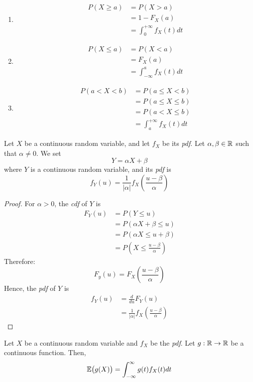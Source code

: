 \documentclass{article}
\begin{document}
	\begin{enumerate}
		\item 
		\begin{align*}
			P (X \geq a) &= P (X > a) \\
			&= 1 - F_X (a) \\
			&= \int_0^{+\infty} f_X (t) dt
		\end{align*}
		\item 
		\begin{align*}
			P (X \leq a) &= P (X < a) \\
			&= F_X (a) \\
			&= \int_{- \infty}^a  f_X (t) dt
		\end{align*}
		\item 
		\begin{align*}
			P (a < X < b) &= P (a \leq X < b) \\
			&= P (a \leq X \leq b) \\
			&= P (a < X \leq b) \\
			&= \int_a^{+\infty} f_X (t) dt
		\end{align*}
	\end{enumerate}
\pagebreak
	\begin{prop}
		Let $X$ be a continuous random variable, and let $f_X$ be its \emph{pdf}. Let $\alpha, \beta \in \mathbb{R}$ such that $\alpha \neq 0$. We set $$ Y = \alpha X + \beta$$ 
		where $Y$ is a continuous random variable, and its \emph{pdf} is
		$$ f_Y (u) = \frac{1}{|\alpha|} f_X \left( \frac{u - \beta}{\alpha} \right)$$
	\end{prop}
	\begin{proof}
		For $\alpha >0$, the \emph{cdf} of $Y$ is
		\begin{align*}
			F_Y (u) &= P (Y \leq u) \\
			&= P (\alpha X + \beta \leq u) \\
			&= P \left( \alpha X \leq u + \beta  \right) \\
			&= P \left( X \leq \frac{u - \beta}{\alpha} \right)
		\end{align*}
		Therefore:
		$$ F_y(u) = F_X \left(  \frac{u-\beta}{\alpha}\right)$$
		Hence, the \emph{pdf} of $Y$ is
		\begin{align*}
			f_Y (u) &= \frac{d}{du} F_Y (u) \\ 
			&= \frac{1}{|\alpha|} f_X \left( \frac{u-\beta}{\alpha} \right)
		\end{align*}
	\end{proof}
	\begin{defn}
		Let $X$ be a continuous random variable and $f_X$ be the \emph{pdf}. Let $g: \mathbb{R} \to \mathbb{R}$ be a continuous function. Then, 
		$$ \mathbb{E} \big( g(X) \big) = \int_{-\infty}^{\infty} g(t) f_X (t) dt$$
	\end{defn}
\end{document}
